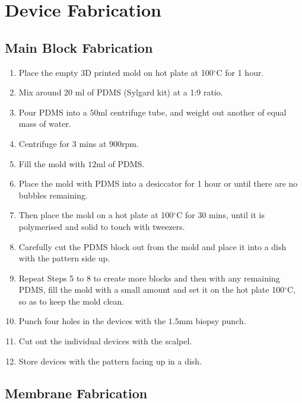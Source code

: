 \section{Device Fabrication}

\subsection{Main Block Fabrication}

\begin{enumerate}
	  \setlength\itemsep{-0.1em}
	\item Place the empty 3D printed mold on hot plate at 100$^{\circ}$C for 1 hour.
	\item Mix around 20 ml of PDMS (Sylgard kit) at a 1:9 ratio. 
	\item Pour PDMS into a $50  \text{ml}$ centrifuge tube, and weight out another of equal mass of water.
	\item Centrifuge for 3 mins at $900  \text{rpm}$. 
	\item Fill the mold with $12  \text{ml}$ of PDMS.
	\item Place the mold with PDMS into a desiccator for 1 hour or until there are no bubbles remaining.
	\item Then place the mold on a hot plate at 100$^{\circ}$C for 30 mins, until it is polymerised and solid to touch with tweezers. 
	\item Carefully cut the PDMS block out from the mold and place it into a dish with the pattern side up.
	\item Repeat Steps 5 to 8 to create more blocks and then with any remaining PDMS, fill the mold with a small amount and set it on the hot plate 100$^{\circ}$C, so as to keep the mold clean.
	\item Punch four holes in the devices with the $1.5  \text{mm}$ biopsy punch.
	\item Cut out the individual devices with the scalpel.
	\item Store devices with the pattern facing up in a dish.
\end{enumerate}

\subsection{Membrane Fabrication}

